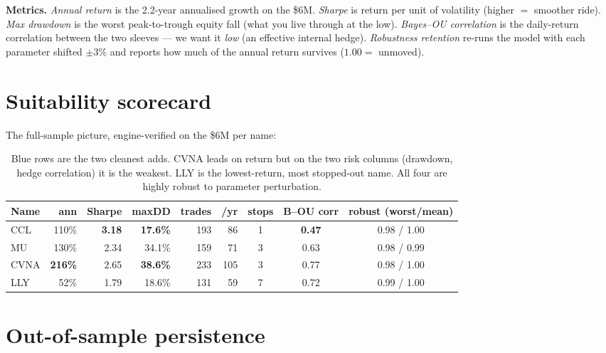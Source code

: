 \documentclass[11pt]{article}
\begin{document}
\textbf{Metrics.} \emph{Annual return} is the 2.2-year annualised growth on the \$6M. \emph{Sharpe}
is return per unit of volatility (higher $=$ smoother ride). \emph{Max drawdown} is the worst
peak-to-trough equity fall (what you live through at the low). \emph{Bayes--OU correlation} is
the daily-return correlation between the two sleeves --- we want it \emph{low} (an effective
internal hedge). \emph{Robustness retention} re-runs the model with each parameter shifted
$\pm3\%$ and reports how much of the annual return survives ($1.00 =$ unmoved).

\clearpage
\section{Suitability scorecard}

The full-sample picture, engine-verified on the \$6M per name:

\begin{table}[H]\centering\small
\renewcommand{\arraystretch}{1.25}
\begin{tabular}{l r r r r r c c c}
\toprule
\textbf{Name} & \textbf{ann} & \textbf{Sharpe} & \textbf{maxDD} & \textbf{trades} & \textbf{/yr}
 & \textbf{stops} & \textbf{B--OU corr} & \textbf{robust (worst/mean)}\\
\midrule
\rowcolor{bckeep} CCL  & 110\% & \textbf{3.18} & \textbf{17.6\%} & 193 & 86  & 1 & \textbf{0.47} & 0.98 / 1.00\\
\rowcolor{bckeep} MU   & 130\% & 2.34 & 34.1\% & 159 & 71  & 3 & 0.63 & 0.98 / 0.99\\
CVNA & \textbf{216\%} & 2.65 & \textbf{38.6\%} & 233 & 105 & 3 & 0.77 & 0.98 / 1.00\\
LLY  & 52\%  & 1.79 & 18.6\% & 131 & 59  & 7 & 0.72 & 0.99 / 1.00\\
\bottomrule
\end{tabular}
\caption*{\footnotesize Blue rows are the two cleanest adds. CVNA leads on return but on the two
risk columns (drawdown, hedge correlation) it is the weakest. LLY is the lowest-return, most
stopped-out name. All four are highly robust to parameter perturbation.}
\end{table}

\section{Out-of-sample persistence}
\end{document}
